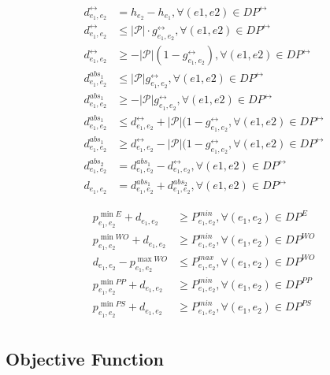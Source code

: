 \documentclass{article}
\newcommand{\scriptP}{\mathcal{P}}
\begin{document}
\begin{align}
    d^{\leftrightarrow}_{e_1, e_2} &= h_{e_2} - h_{e_1}  , \forall (e1, e2) \in DP^{\leftrightarrow} \\
    d^{\leftrightarrow}_{e_1, e_2} &\le |\scriptP|\cdot g^{\leftrightarrow}_{e_1, e_2}  , \forall (e1, e2) \in DP^{\leftrightarrow} \\
    d^{\leftrightarrow}_{e_1, e_2} &\ge - |\scriptP| (1 - g^{\leftrightarrow}_{e_1, e_2})   , \forall (e1, e2) \in DP^{\leftrightarrow} \\
    d^{abs_1}_{e_1, e_2} &\le |\scriptP|g^{\leftrightarrow}_{e_1, e_2}  , \forall (e1, e2) \in DP^{\leftrightarrow} \\
    d^{abs_1}_{e_1, e_2} &\ge - |\scriptP|g^{\leftrightarrow}_{e_1, e_2}  , \forall (e1, e2) \in DP^{\leftrightarrow} \\
    d^{abs_1}_{e_1, e_2} &\le d^{\leftrightarrow}_{e_1, e_2} + |\scriptP| (1 - g^{\leftrightarrow}_{e_1, e_2}  , \forall (e1, e2) \in DP^{\leftrightarrow} \\
    d^{abs_1}_{e_1, e_2} &\ge d^{\leftrightarrow}_{e_1, e_2} - |\scriptP| (1 - g^{\leftrightarrow}_{e_1, e_2}  , \forall (e1, e2) \in DP^{\leftrightarrow} \\
    d^{abs_2}_{e_1, e_2} &= d^{abs_1}_{e_1, e_2} - d^{\leftrightarrow}_{e_1, e_2}  , \forall (e1, e2) \in DP^{\leftrightarrow} \\
    d_{e_1, e_2} &= d^{abs_1}_{e_1, e_2} + d^{abs_2}_{e_1, e_2} , \forall (e1, e2) \in DP^{\leftrightarrow} 
\end{align}

\begin{align}
    p^{\min E}_{e_1, e_2} + d_{e_1, e_2} &\ge P^{min}_{e_1, e_2}, \forall (e_1, e_2)\in DP^{E} \\
    p^{\min WO}_{e_1, e_2} + d_{e_1, e_2} &\ge P^{min}_{e_1, e_2}, \forall (e_1, e_2)\in DP^{WO} \\
    d_{e_1, e_2} - p^{\max WO}_{e_1, e_2} &\le P^{max}_{e_1, e_2}, \forall (e_1, e_2)\in DP^{WO} \\
    p^{\min PP}_{e_1, e_2} + d_{e_1, e_2} &\ge P^{min}_{e_1, e_2}, \forall (e_1, e_2)\in DP^{PP} \\
    p^{\min PS}_{e_1, e_2} + d_{e_1, e_2} &\ge P^{min}_{e_1, e_2}, \forall (e_1, e_2)\in DP^{PS} \\
\end{align}

\subsection{Objective Function}
\end{document}
